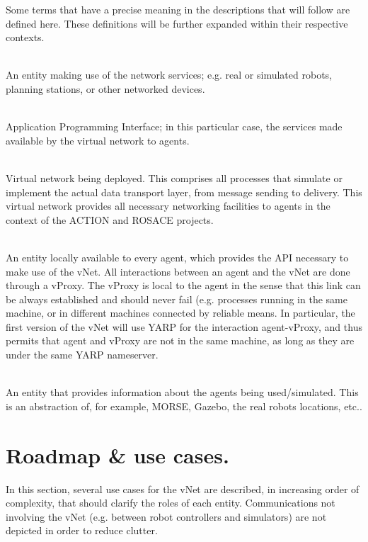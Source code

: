 \documentclass[a4paper,11pt]{article}
\begin{document}
Some terms that have a precise meaning in the descriptions that will follow are defined here. These definitions will be further expanded within their respective contexts.

\begin{description}
    \newcommand{\define}[2]{\item[#1:]\hfill\\#2.}
    
    \define{Agent}{An entity making use of the network services; e.g. real or simulated robots, planning stations, or other networked devices}
    
    \define{API}{Application Programming Interface; in this particular case, the services made available by the virtual network to agents}
    
    \define{vNet}{Virtual network being deployed. This comprises all processes that simulate or implement the actual data transport layer, from message sending to delivery. This virtual network provides all necessary networking facilities to agents in the context of the ACTION and ROSACE projects}
    
    \define{vProxy}{An entity locally available to every agent, which provides the API necessary to make use of the vNet. All interactions between an agent and the vNet are done through a vProxy. The vProxy is local to the agent in the sense that this link can be always established and should never fail (e.g. processes running in the same machine, or in different machines connected by reliable means. In particular, the first version of the vNet will use YARP for the interaction agent-vProxy, and thus permits that agent and vProxy are not in the same machine, as long as they are under the same YARP nameserver}
    
    \define{vWorldModel}{An entity that provides information about the agents being used/simulated. This is an abstraction of, for example, MORSE, Gazebo, the real robots locations, etc.}
    
    
\end{description}

\section{Roadmap \& use cases.}

In this section, several use cases for the vNet are described, in increasing order of complexity, that should clarify the roles of each entity. Communications not involving the vNet (e.g. between robot controllers and simulators) are not depicted in order to reduce clutter.
\end{document}
